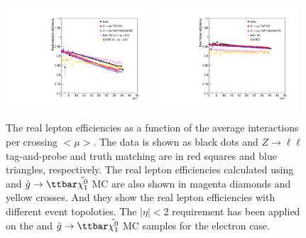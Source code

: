 \begin{figure}[htbp]
\includegraphics[width=0.48\textwidth]{real_efficiency_vs_AvgMu_elec.pdf}
\includegraphics[width=0.48\textwidth]{real_efficiency_vs_AvgMu_muon.pdf}
\caption{
The real lepton efficiencies as a function of the average interactions per crossing $<\mu>$.
The data is shown as black dots and $Z\to \ell\ell$ tag-and-probe and truth matching are in red squares and blue triangles, respectively.
The real lepton efficiencies calculated using \ttbar and $\tilde{g}\to\ttbar\tilde{\chi^{0}_{1}}$ MC are also shown in magenta diamonds and yellow crosses.
And they show the real lepton efficiencies with different event topoloties.
The $|\eta|<2$ requirement has been applied on the \ttbar and $\tilde{g}\to\ttbar\tilde{\chi^{0}_{1}}$ MC samples for the electron case.
}
\label{fig:RLE_vs_pileup}
\end{figure}

